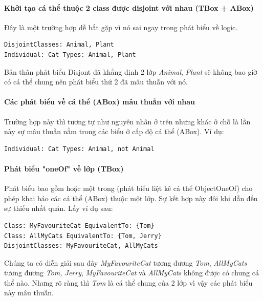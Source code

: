 \paragraph{Khởi tạo cá thể thuộc 2 class được disjoint với nhau (TBox + ABox)} Đây là một trường hợp dễ bắt gặp vì nó sai ngay trong phát biểu về logic.
\begin{verbatim}
DisjointClasses: Animal, Plant
Individual: Cat Types: Animal, Plant
\end{verbatim}
Bản thân phát biểu Disjont đã khẳng định 2 lớp \textit{Animal}, \textit{Plant} sẽ không bao giờ có cá thể chung nên phát biểu thứ 2 đã mâu thuẫn với nó.

\paragraph{Các phát biểu về cá thể (ABox) mâu thuẫn với nhau} Trường hợp này thì tương tự như nguyên nhân ở trên nhưng khác ở chỗ là lần này sự mâu thuẫn nằm trong các biểu ở cấp độ cá thể (ABox). Ví dụ:	
\begin{verbatim}
Individual: Cat Types: Animal, not Animal
\end{verbatim}

\paragraph{Phát biểu "oneOf" về lớp (TBox)} Phát biểu bao gồm hoặc một trong (phát biểu liệt kê cá thể ObjectOneOf) cho phép khai báo các cá thể (ABox) thuộc một lớp. Sự kết hợp này đôi khi dẫn đến sự thiếu nhất quán. Lấy ví dụ sau:
\begin{verbatim}
Class: MyFavouriteCat EquivalentTo: {Tom}
Class: AllMyCats EquivalentTo: {Tom, Jerry}
DisjointClasses: MyFavouriteCat, AllMyCats
\end{verbatim}
Chúng ta có diễn giải sau đây \textit{MyFavouriteCat} tương đương \textit{{Tom}}, \textit{AllMyCats} tương đương \textit{{Tom, Jerry}}, \textit{MyFavouriteCat} và \textit{AllMyCats} không được có chung cá thể nào. Nhưng rõ ràng thì \textit{Tom} là cá thể chung của 2 lớp vì vậy các phát biểu này mâu thuẫn.



